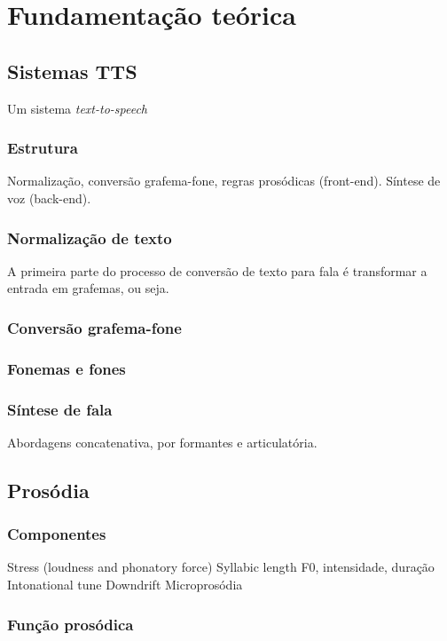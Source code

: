 
\chapter{Fundamentação teórica}
\section{Sistemas TTS}
Um sistema \emph{text-to-speech}
\subsection{Estrutura}
Normalização, conversão grafema-fone, regras prosódicas (front-end).
Síntese de voz (back-end).
\subsection{Normalização de texto}
A primeira parte do processo de conversão de texto para fala é transformar a entrada em grafemas, ou seja.
\subsection{Conversão grafema-fone}
\subsection{Fonemas e fones}
\subsection{Síntese de fala}
Abordagens concatenativa, por formantes e articulatória.
\section{Prosódia}
\subsection{Componentes}
Stress (loudness and phonatory force)
Syllabic length
F0, intensidade, duração
Intonational tune
Downdrift
Microprosódia
\subsection{Função prosódica}
